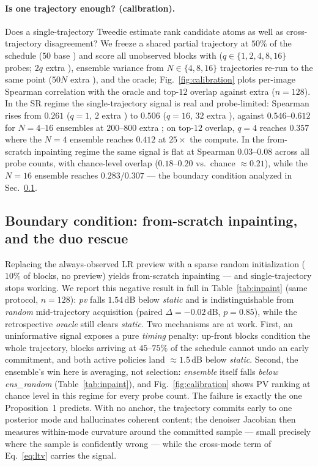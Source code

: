 \paragraph{Is one trajectory enough? (calibration).} Does a
single-trajectory Tweedie estimate rank candidate atoms as well as
cross-trajectory disagreement? We freeze a
shared partial trajectory at $50\%$ of the schedule ($50$ base \nfe)
and score all unobserved blocks with \pvas{} ($q\in\{1,2,4,8,16\}$
probes; $2q$ extra \nfe), ensemble variance from $N\in\{4,8,16\}$
trajectories re-run to the same point ($50N$ extra \nfe), and the
oracle; Fig.~\ref{fig:calibration} plots per-image
Spearman correlation with the oracle and top-$12$ overlap against extra
\nfe{} ($n{=}128$)\RLOCAL. In the SR regime the single-trajectory
signal is real and probe-limited: Spearman rises from $0.261$
($q{=}1$, $2$ extra \nfe) to $0.506$ ($q{=}16$, $32$ extra \nfe),
against $0.546$--$0.612$ for $N{=}4$--$16$ ensembles at $200$--$800$
extra \nfe; on top-$12$ overlap, $q{=}4$ reaches $0.357$ where the
$N{=}4$ ensemble reaches $0.412$ at $25\times$ the compute. In the
from-scratch inpainting regime the same signal is flat at Spearman
$0.03$--$0.08$ across all probe counts, with chance-level overlap
($0.18$--$0.20$ vs.\ chance ${\approx}0.21$), while the $N{=}16$
ensemble reaches $0.283$/$0.307$ --- the boundary condition analyzed
in Sec.~\ref{sec:exp_inpaint}.

\subsection{Boundary condition: from-scratch inpainting, and the duo
rescue}\label{sec:exp_inpaint}

Replacing the always-observed LR preview with a sparse random
initialization ($10\%$ of blocks, no preview) yields from-scratch
inpainting --- and single-trajectory \pvas{} stops working. We report
this negative result in full in Table~\ref{tab:inpaint} (same protocol,
$n{=}128$)\RLOCAL: \emph{pv} falls $1.54$\,dB below \emph{static} and
is indistinguishable from \emph{random} mid-trajectory acquisition
(paired $\Delta{=}{-}0.02$\,dB, $p{=}0.85$), while the retrospective
\emph{oracle} still clears \emph{static}. Two mechanisms are at work.
First, an uninformative signal exposes a pure \emph{timing} penalty:
up-front blocks condition the whole trajectory, blocks arriving at
$45$--$75\%$ of the schedule cannot undo an early commitment, and both
active policies land ${\approx}1.5$\,dB below \emph{static}. Second,
the ensemble's win here is averaging, not selection: \emph{ensemble}
itself falls \emph{below} \emph{ens\_random} (Table~\ref{tab:inpaint}),
and Fig.~\ref{fig:calibration} shows PV ranking at chance level in this
regime for every probe count. The failure is exactly the one
Proposition~1 predicts. With no anchor, the trajectory commits early to
one posterior mode and hallucinates coherent content; the denoiser
Jacobian then measures within-mode curvature around the committed
sample --- small precisely where the sample is confidently wrong ---
while the cross-mode term of Eq.~\ref{eq:ltv} carries the signal.

